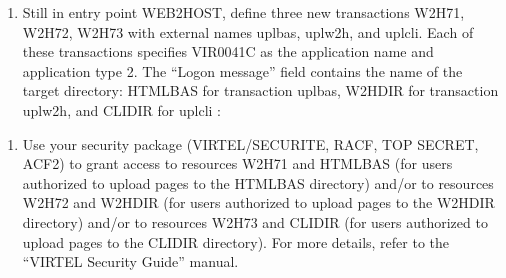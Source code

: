 \documentclass[letterpaper,10pt,english]{sphinxmanual}
\begin{document}
\sphinxAtStartPar
{}
\begin{enumerate}
%
\setcounter{enumi}{1}
\item {} 
\sphinxAtStartPar
Still in entry point WEB2HOST, define three new transactions W2H\textendash{}71, W2H\sphinxhyphen{}72, W2H\sphinxhyphen{}73 with external names uplbas, uplw2h, and uplcli. Each of these transactions specifies VIR0041C as the application name and application type 2. The “Logon message” field contains the name of the target directory: HTMLBAS for transaction uplbas, W2HDIR for transaction uplw2h, and CLI\sphinxhyphen{}DIR for uplcli :

\end{enumerate}

\sphinxAtStartPar
{} 

\sphinxAtStartPar
{} 

\sphinxAtStartPar
{} 
\begin{enumerate}
%
\setcounter{enumi}{2}
\item {} 
\sphinxAtStartPar
Use your security package (VIRTEL/SECURITE, RACF, TOP SECRET, ACF2) to grant access to resources W2H\sphinxhyphen{}71 and HTMLBAS (for users authorized to upload pages to the HTMLBAS directory) and/or to resources W2H\sphinxhyphen{}72 and W2HDIR (for users authorized to upload pages to the W2H\sphinxhyphen{}DIR directory) and/or to resources W2H\sphinxhyphen{}73 and CLI\sphinxhyphen{}DIR (for users authorized to upload pages to the CLI\sphinxhyphen{}DIR directory). For more details, refer to the “VIRTEL Security Guide” manual.

\end{enumerate}

\ignorespaces 
\end{document}
